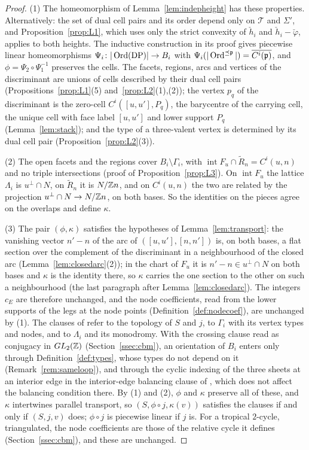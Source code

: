 \begin{proof}
(1) The homeomorphism of Lemma~\ref{lem:indepheight} has these properties. Alternatively: the set of dual cell pairs and its order depend only on $\mathcal T$ and $\Sigma'$, and Proposition~\ref{prop:L1}, which
uses only the strict convexity of $\check h_i$ and $\check h_i-\check\varphi$, applies to both heights. The inductive
construction in its proof gives piecewise linear homeomorphisms $\Psi_i\colon|\operatorname{Ord}(\mathrm{DP})|\to B_i$ with
$\Psi_i(|\operatorname{Ord}^{\preceq {\mathfrak p}}|)=\overline{C^i({\mathfrak p})}$, and $\phi=\Psi_2\circ\Psi_1^{-1}$ preserves the cells. The facets, regions,
arcs and vertices of the discriminant are unions of cells described by their dual cell pairs (Propositions~\ref{prop:L1}(5)
and~\ref{prop:L2}(1),(2)); the vertex $p_q$ of the discriminant is the zero-cell $C^i([u,u'],P_q)$, the barycentre of the carrying cell, the
unique cell with face label $[u,u']$ and lower support $P_q$ (Lemma~\ref{lem:stack}); and the type of a three-valent vertex
is determined by its dual cell pair (Proposition~\ref{prop:L2}(3)).

(2) The open facets and the regions cover $B_i\setminus\Gamma_i$, with $\operatorname{int}F_u\cap\widetilde R_n=C^i(u,n)$
and no triple intersections (proof of Proposition~\ref{prop:L3}). On $\operatorname{int}F_u$ the lattice $\Lambda_i$ is
$u^\perp\cap N$, on $\widetilde R_n$ it is $N/\mathbb Z n$, and on $C^i(u,n)$ the two are related by the projection
$u^\perp\cap N\to N/\mathbb Z n$, on both bases. So the identities on the pieces agree on the overlaps and define $\kappa$.

(3) The pair $(\phi,\kappa)$ satisfies the hypotheses of Lemma~\ref{lem:transport}: the vanishing vector $n'-n$ of the arc of
$([u,u'],[n,n'])$ is, on both bases, a flat section over the complement of the discriminant in a neighbourhood of the closed
arc (Lemma~\ref{lem:closedarc}(2)); in the chart of $F_u$ it is $n'-n\in u^\perp\cap N$ on both bases and $\kappa$ is the
identity there, so $\kappa$ carries the one section to the other on such a neighbourhood (the last paragraph
after Lemma~\ref{lem:closedarc}). The integers $c_E$ are
therefore unchanged, and the node coefficients, read from the lower supports of the legs at the node points
(Definition~\ref{def:nodecoef}), are unchanged by (1). The clauses of \cite[Def.~7.2]{CBM} refer to the topology of $S$
and $j$, to $\Gamma_i$ with its vertex types and nodes, and to $\Lambda_i$ and its monodromy. With the crossing clause read as conjugacy in $GL_2(\mathbb Z)$ (Section~\ref{ssec:cbm}), an orientation of $B_i$ enters
only through Definition~\ref{def:types}, whose types do not depend on it (Remark~\ref{rem:sameloop}), and through the cyclic
indexing of the three sheets at an interior edge in the interior-edge balancing clause of \cite[Def.~7.2]{CBM}, which does not
affect the balancing condition there. By (1) and (2),
$\phi$ and $\kappa$ preserve all of these, and $\kappa$ intertwines parallel transport, so $(S,\phi\circ j,\kappa(v))$
satisfies the clauses if and only if $(S,j,v)$ does; $\phi\circ j$ is piecewise linear if $j$ is. For a tropical
$2$-cycle, triangulated, the node coefficients are those of the relative cycle it defines (Section~\ref{ssec:cbm}), and
these are unchanged.
\end{proof}

